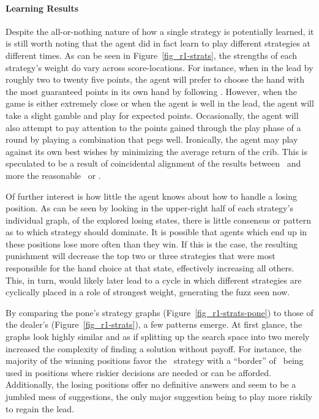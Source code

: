 



\paragraph*{Learning Results}


Despite the all-or-nothing nature of how a single strategy is potentially
learned,
it is still worth noting that the agent did in fact learn to play different
strategies at different times.
%
As can be seen in Figure~\ref{fig_r1-strats},
the strengths of each strategy's weight do vary across score-locations.
%
For instance, when in the lead by
roughly two to twenty five points,
the agent will prefer to choose the hand with the most guaranteed
points in its own hand
by following \handmaxmin.
%
However, when the game is either extremely close
or when the agent is well in the lead,
the agent will take a slight gamble and play for expected points.
%
Occasionally, the agent will also attempt to pay attention to the points
gained through the play phase of a round by playing a combination that pegs
well.
%
Ironically,
the agent may play against its own best wishes by minimizing the average return
of the crib.
%
This is speculated to be a result of coincidental alignment of the results between
\cribminavg\ and more the reasonable \handmaxmin\
or \handmaxavg.

Of further interest is how little the agent knows about how to handle a losing
position.
%
As can be seen by looking in the upper-right half of each strategy's
individual graph,
of the explored losing states,
there is little consensus or pattern as to which strategy should dominate.
%
It is possible that agents which end up in these positions lose more often than
they win.
%
If this is the case,
the resulting punishment will decrease the top two or three strategies that were
most responsible for the hand choice at that state,
effectively increasing all others.
%
This, in turn, would likely later lead to a cycle in which different strategies
are cyclically placed in a role of strongest weight,
generating the fuzz seen now.

By comparing the pone's strategy graphs (Figure~\ref{fig_r1-strats-pone})
to those of the dealer's (Figure~\ref{fig_r1-strats}),
a few patterns emerge.
%
At first glance,
the graphs look highly similar and as if splitting up the search space into two
merely increased the complexity of finding a solution without payoff.
%
For instance,
the majority of the winning positions favor the \handmaxmin\ strategy with
a ``border'' of \handmaxavg\ being used in positions where riskier decisions
are needed or can be afforded.
%
Additionally, the losing positions offer no definitive answers and seem to be a
jumbled mess of suggestions,
the only major suggestion being to play more riskily to regain the lead.

